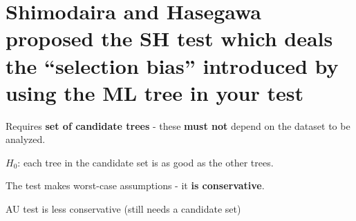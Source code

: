 \myNewSlide 
\section*{Shimodaira and Hasegawa proposed the SH test which deals the ``selection bias'' introduced by using the ML tree in your test}
Requires {\bf set of candidate trees} - these {\bf must not} depend on the dataset to be analyzed.

$H_0$: each tree in the candidate set is as good as the other trees.

The test makes worst-case assumptions - it {\bf is conservative}.

AU test is less conservative (still needs a candidate set)

